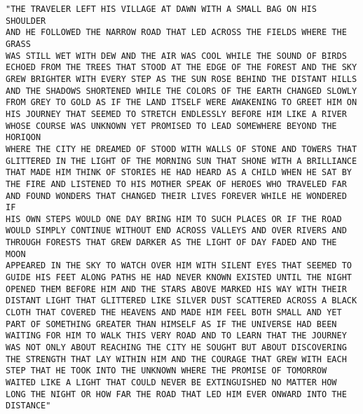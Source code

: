\documentclass[12pt,a4paper]{article}
\begin{document}
\begin{lstlisting}
"THE TRAVELER LEFT HIS VILLAGE AT DAWN WITH A SMALL BAG ON HIS SHOULDER
AND HE FOLLOWED THE NARROW ROAD THAT LED ACROSS THE FIELDS WHERE THE GRASS
WAS STILL WET WITH DEW AND THE AIR WAS COOL WHILE THE SOUND OF BIRDS
ECHOED FROM THE TREES THAT STOOD AT THE EDGE OF THE FOREST AND THE SKY
GREW BRIGHTER WITH EVERY STEP AS THE SUN ROSE BEHIND THE DISTANT HILLS
AND THE SHADOWS SHORTENED WHILE THE COLORS OF THE EARTH CHANGED SLOWLY
FROM GREY TO GOLD AS IF THE LAND ITSELF WERE AWAKENING TO GREET HIM ON
HIS JOURNEY THAT SEEMED TO STRETCH ENDLESSLY BEFORE HIM LIKE A RIVER
WHOSE COURSE WAS UNKNOWN YET PROMISED TO LEAD SOMEWHERE BEYOND THE HORIQON
WHERE THE CITY HE DREAMED OF STOOD WITH WALLS OF STONE AND TOWERS THAT
GLITTERED IN THE LIGHT OF THE MORNING SUN THAT SHONE WITH A BRILLIANCE
THAT MADE HIM THINK OF STORIES HE HAD HEARD AS A CHILD WHEN HE SAT BY
THE FIRE AND LISTENED TO HIS MOTHER SPEAK OF HEROES WHO TRAVELED FAR
AND FOUND WONDERS THAT CHANGED THEIR LIVES FOREVER WHILE HE WONDERED IF
HIS OWN STEPS WOULD ONE DAY BRING HIM TO SUCH PLACES OR IF THE ROAD
WOULD SIMPLY CONTINUE WITHOUT END ACROSS VALLEYS AND OVER RIVERS AND
THROUGH FORESTS THAT GREW DARKER AS THE LIGHT OF DAY FADED AND THE MOON
APPEARED IN THE SKY TO WATCH OVER HIM WITH SILENT EYES THAT SEEMED TO
GUIDE HIS FEET ALONG PATHS HE HAD NEVER KNOWN EXISTED UNTIL THE NIGHT
OPENED THEM BEFORE HIM AND THE STARS ABOVE MARKED HIS WAY WITH THEIR
DISTANT LIGHT THAT GLITTERED LIKE SILVER DUST SCATTERED ACROSS A BLACK
CLOTH THAT COVERED THE HEAVENS AND MADE HIM FEEL BOTH SMALL AND YET
PART OF SOMETHING GREATER THAN HIMSELF AS IF THE UNIVERSE HAD BEEN
WAITING FOR HIM TO WALK THIS VERY ROAD AND TO LEARN THAT THE JOURNEY
WAS NOT ONLY ABOUT REACHING THE CITY HE SOUGHT BUT ABOUT DISCOVERING
THE STRENGTH THAT LAY WITHIN HIM AND THE COURAGE THAT GREW WITH EACH
STEP THAT HE TOOK INTO THE UNKNOWN WHERE THE PROMISE OF TOMORROW
WAITED LIKE A LIGHT THAT COULD NEVER BE EXTINGUISHED NO MATTER HOW
LONG THE NIGHT OR HOW FAR THE ROAD THAT LED HIM EVER ONWARD INTO THE DISTANCE"
\end{lstlisting}
\end{document}
